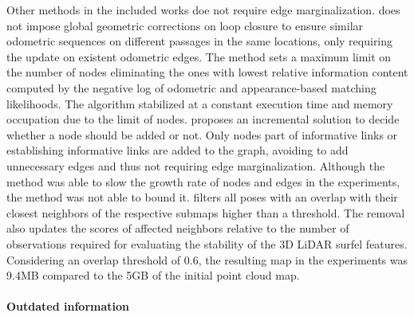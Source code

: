 Other methods in the included works doe not require edge marginalization.
\cite{maddern-et-al:2012:6224622} does not impose global geometric corrections on loop closure to ensure similar odometric sequences on different passages in the same locations, only requiring the update on existent odometric edges. The method sets a maximum limit on the number of nodes eliminating the ones with lowest relative information content computed by the negative log of odometric and appearance-based matching likelihoods. The algorithm stabilized at a constant execution time and memory occupation due to the limit of nodes.
\cite{ila-et-al:2017:0278364917691110} proposes an incremental solution to decide whether a node should be added or not. Only nodes part of informative links or establishing informative links are added to the graph, avoiding to add unnecessary edges and thus not requiring edge marginalization. Although the method was able to slow the growth rate of nodes and edges in the experiments, the method was not able to bound it.
\cite{egger-et-al:2018:8593854} filters all poses with an overlap with their closest neighbors of the respective submaps higher than a threshold. The removal also updates the scores of affected neighbors relative to the number of observations required for evaluating the stability of the 3D LiDAR surfel features. Considering an overlap threshold of 0.6, the resulting map in the experiments was 9.4MB compared to the 5GB of the initial point cloud map.


\paragraph{Outdated information}

